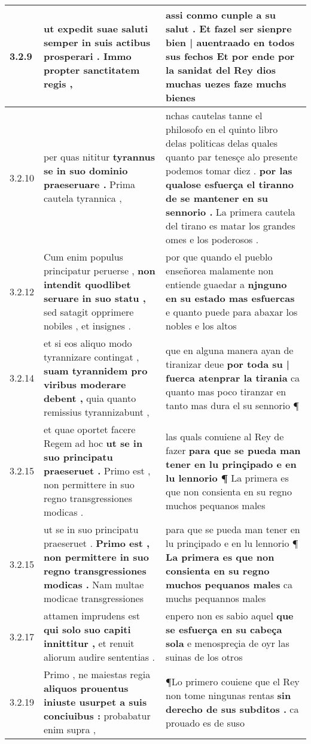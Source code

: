 \begin{tabular}{|p{1cm}|p{6.5cm}|p{6.5cm}|}
3.2.9 & ut expedit suae saluti \textbf{ semper in suis actibus prosperari . } Immo propter sanctitatem regis , & assi conmo cunple a su salut . \textbf{ Et fazel ser sienpre bien | auentraado en todos sus fechos } Et por ende por la sanidat del Rey dios muchas uezes faze muchs bienes \\\hline
3.2.10 & per quas nititur \textbf{ tyrannus se in suo dominio praeseruare . } Prima cautela tyrannica , & nchas cautelas tanne el philosofo en el quinto libro delas politicas delas quales quanto par tenesçe alo presente podemos tomar diez . \textbf{ por las qualose esfuerça el tiranno de se mantener en su sennorio . } La primera cautela del tirano es matar los grandes omes e los poderosos . \\\hline
3.2.12 & Cum enim populus principatur peruerse , \textbf{ non intendit quodlibet seruare in suo statu , } sed satagit opprimere nobiles , et insignes . & por que quando el pueblo enseñorea malamente non entiende guaedar a \textbf{ njnguno en su estado mas esfuercas } e quanto puede para abaxar los nobles e los altos \\\hline
3.2.14 & et si eos aliquo modo tyrannizare contingat , \textbf{ suam tyrannidem pro viribus moderare debent , } quia quanto remissius tyrannizabunt , & que en alguna manera ayan de tiranizar deue \textbf{ por toda su | fuerca atenprar la tirania } ca quanto mas poco tiranzar en tanto mas dura el su sennorio ¶ \\\hline
3.2.15 & et quae oportet facere Regem ad hoc \textbf{ ut se in suo principatu praeseruet . } Primo est , non permittere in suo regno transgressiones modicas . & las quals conuiene al Rey de fazer \textbf{ para que se pueda man tener en lu prinçipado e en lu lennorio ¶ } La primera es que non consienta en su regno muchos pequanos males \\\hline
3.2.15 & ut se in suo principatu praeseruet . \textbf{ Primo est , non permittere in suo regno transgressiones modicas . } Nam multae modicae transgressiones & para que se pueda man tener en lu prinçipado e en lu lennorio ¶ \textbf{ La primera es que non consienta en su regno muchos pequanos males } ca muchs pequannos males \\\hline
3.2.17 & attamen imprudens est \textbf{ qui solo suo capiti innittitur , } et renuit aliorum audire sententias . & enpero non es sabio aquel \textbf{ que se esfuerça en su cabeça sola } e menospreçia de oyr las suinas de los otros \\\hline
3.2.19 & Primo , ne maiestas regia \textbf{ aliquos prouentus iniuste usurpet a suis conciuibus : } probabatur enim supra , & ¶Lo primero couiene que el Rey non tome ningunas rentas \textbf{ sin derecho de sus subditos . } ca prouado es de suso \\\hline

\end{tabular}
